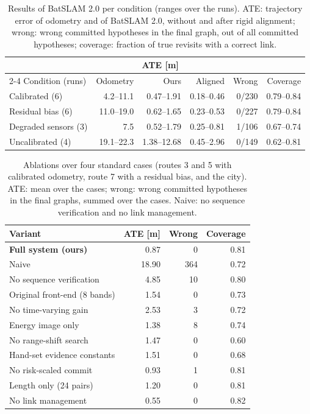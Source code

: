 \begin{table}[t]
\centering
\footnotesize
\caption{Results of BatSLAM 2.0 per condition (ranges over the runs). ATE: trajectory error of odometry and of BatSLAM 2.0, without and after rigid alignment; wrong: wrong committed hypotheses in the final graph, out of all committed hypotheses; coverage: fraction of true revisits with a correct link.}
\label{tab:main}
\begin{tabular}{lrrrrr}
\toprule
 & \multicolumn{3}{c}{ATE [m]} & & \\
\cmidrule(lr){2-4}
Condition (runs) & Odometry & Ours & Aligned & Wrong & Coverage \\
\midrule
Calibrated (6) & 4.2--11.1 & 0.47--1.91 & 0.18--0.46 & 0/230 & 0.79--0.84 \\
Residual bias (6) & 11.0--19.0 & 0.62--1.65 & 0.23--0.53 & 0/227 & 0.79--0.84 \\
Degraded sensors (3) & 7.5 & 0.52--1.79 & 0.25--0.81 & 1/106 & 0.67--0.74 \\
Uncalibrated (4) & 19.1--22.3 & 1.38--12.68 & 0.45--2.96 & 0/149 & 0.62--0.81 \\
\bottomrule
\end{tabular}
\end{table}

\begin{table}[t]
\centering
\footnotesize
\caption{Ablations over four standard cases (routes 3 and 5 with calibrated odometry, route 7 with a residual bias, and the city). ATE: mean over the cases; wrong: wrong committed hypotheses in the final graphs, summed over the cases. Naive: no sequence verification and no link management.}
\label{tab:ablation}
\setlength{\tabcolsep}{5pt}
\begin{tabular}{lrrr}
\toprule
Variant & ATE [m] & Wrong & Coverage \\
\midrule
\textbf{Full system (ours)} & 0.87 & 0 & 0.81 \\
\midrule
Naive & 18.90 & 364 & 0.72 \\
No sequence verification & 4.85 & 10 & 0.80 \\
\midrule
Original front-end (8 bands) & 1.54 & 0 & 0.73 \\
No time-varying gain & 2.53 & 3 & 0.72 \\
Energy image only & 1.38 & 8 & 0.74 \\
No range-shift search & 1.47 & 0 & 0.60 \\
Hand-set evidence constants & 1.51 & 0 & 0.68 \\
\midrule
No risk-scaled commit & 0.93 & 1 & 0.81 \\
Length only (24 pairs) & 1.20 & 0 & 0.81 \\
No link management & 0.55 & 0 & 0.82 \\
\bottomrule
\end{tabular}
\end{table}

